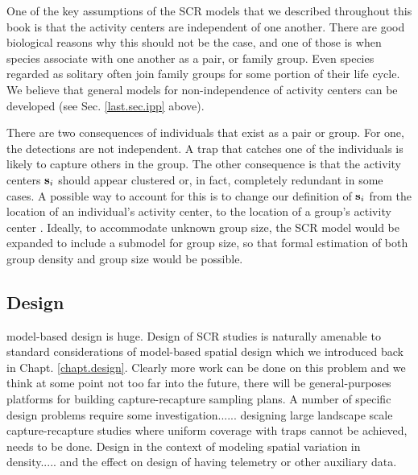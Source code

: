 One of the key assumptions of the SCR models that we described
throughout this book is that the activity centers are independent of
one another. There are good biological reasons why this should not be
the case, and one of those is when species associate with one another
as a pair, or family group.
Even species regarded as solitary often join family
groups for some portion of their life cycle. We believe that general
models for non-independence of activity centers can be developed (see
Sec. \ref{last.sec.ipp} above).

There are two consequences of individuals that exist as a pair or
group. For one, the detections are not independent. A trap that
catches one of the individuals is likely to capture others in the
group.
The other consequence is that the activity centers ${\bf s}_{i}$
should appear clustered or, in fact, completely redundant in some
cases. A possible way to account for this is to change our definition
of ${\bf s}_i$ from the location of an individual's activity center,
to the location of a group's activity center
\citep{russell_etal:2012}. Ideally, to accommodate unknown group size,
the SCR model would be expanded to include a submodel for group size,
so that formal estimation of both group density and group size would
be possible.  %



\subsection{Design}

model-based design is huge. Design of SCR studies is naturally
amenable to standard considerations of model-based spatial design
\citep{muller:2007} which we introduced back in
Chapt. \ref{chapt.design}. Clearly more work can be done on this
problem and we think at some point not too far into the future, there
will be general-purposes platforms for building capture-recapture
sampling plans.
A number of specific design problems require some
investigation...... designing large landscape scale capture-recapture
studies where uniform coverage with traps cannot be achieved, needs
to be done.
Design in the context of modeling spatial variation in
density..... and the effect on design of having telemetry or other
auxiliary data.


